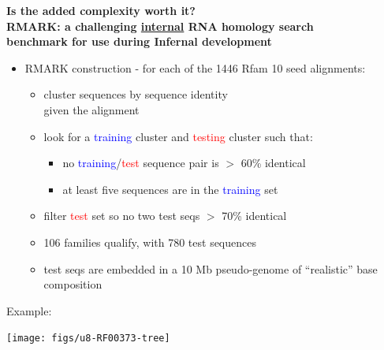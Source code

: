 \documentclass[landscape]{slides}
\begin{document}
\begin{slide}
\begin{center}
\textbf{Is the added complexity worth it? \\
  RMARK: a challenging \underline{internal} RNA homology search \\
  benchmark for use during Infernal development}
\end{center}
\medskip
\begin{minipage}{7in}
\small
\begin{itemize}
\item
  RMARK construction - for each of the 1446 Rfam 10 seed alignments:
  \begin{itemize}
  \item 
    cluster sequences by sequence identity \\ given the alignment
  \item 
    look for a \textcolor{blue}{training} cluster and
    \textcolor{red}{testing} cluster such that: 
    \begin{itemize}
    \item
      no \textcolor{blue}{training}/\textcolor{red}{test} sequence pair is $>$ 60\% identical
    \item
      at least five sequences are in the \textcolor{blue}{training} set
    \end{itemize}
  \item
    filter \textcolor{red}{test} set so no two test seqs $>$ 70\% identical 
  \item
    106 families qualify, with 780 test sequences
  \item
    test seqs are embedded in a 10 Mb pseudo-genome of ``realistic'' base composition
  \end{itemize}
\end{itemize}
\vspace{1.5in}
\end{minipage}
\hspace{0.1in}
\begin{minipage}{3.5in}
  Example: 
\vspace{0.2in}

\begin{center}
\texttt{[image: figs/u8-RF00373-tree]}

\end{center}
\end{minipage}
\end{slide}
\end{document}
